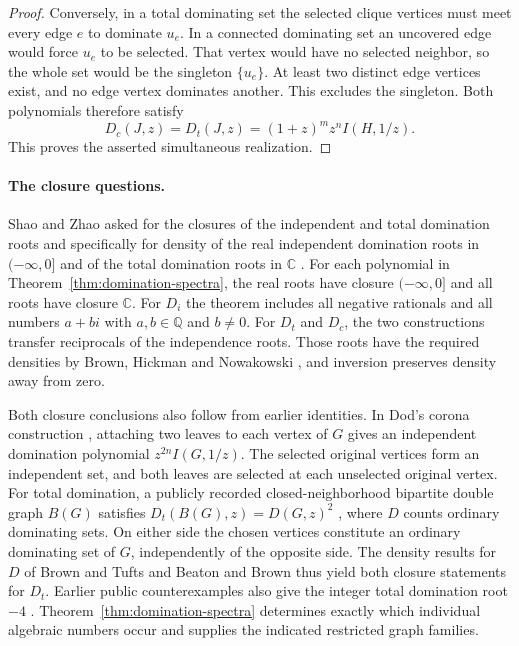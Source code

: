 \documentclass[11pt,a4paper]{article}
\begin{document}
\begin{proof}
Conversely, in a total dominating set the selected clique vertices
must meet every edge $e$ to dominate $u_e$. In a connected dominating
set an uncovered edge would force $u_e$ to be selected. That vertex
would have no selected neighbor, so the whole set would be the singleton
$\{u_e\}$. At least two distinct edge vertices exist, and no edge
vertex dominates another. This excludes the singleton. Both polynomials
therefore satisfy
\[
 D_c(J,z)=D_t(J,z)=(1+z)^m z^n I(H,1/z).
\]
This proves the asserted simultaneous realization.
\end{proof}

\paragraph{The closure questions.}
Shao and Zhao asked for the closures of the independent and total
domination roots and specifically for density of the real independent
domination roots in $(-\infty,0]$ and of the total domination roots in
$\mathbb C$ \cite[Section~5.2, Open Problems~1 and~2]{shao}.
For each polynomial in Theorem~\ref{thm:domination-spectra}, the real
roots have closure $(-\infty,0]$ and all roots have closure $\mathbb C$.
For $D_i$ the theorem includes all negative rationals and all numbers
$a+bi$ with $a,b\in\mathbb Q$ and $b\ne0$. For $D_t$ and $D_c$, the
two constructions transfer reciprocals of the independence roots.
Those roots have the required densities by Brown, Hickman and Nowakowski
\cite{brown2004}, and inversion preserves density away from zero.

Both closure conclusions also follow from earlier identities. In Dod's
corona construction \cite{dod}, attaching two leaves to each vertex
of $G$ gives an independent domination polynomial $z^{2n}I(G,1/z)$.
The selected original vertices form an independent set, and both leaves
are selected at each unselected original vertex. For total domination,
a publicly recorded closed-neighborhood bipartite double graph $B(G)$
satisfies $D_t(B(G),z)=D(G,z)^2$ \cite{mathdb}, where $D$ counts
ordinary dominating sets. On either side the chosen vertices constitute
an ordinary dominating set of $G$, independently of the opposite side.
The density results for $D$ of Brown and Tufts \cite{browntufts} and
Beaton and Brown \cite{brownbeaton} thus yield both closure statements
for $D_t$. Earlier public counterexamples also give the integer total
domination root $-4$ \cite{trutotal,mathdb}. Theorem~\ref{thm:domination-spectra}
determines exactly which individual algebraic numbers occur and supplies
the indicated restricted graph families.
\end{document}
